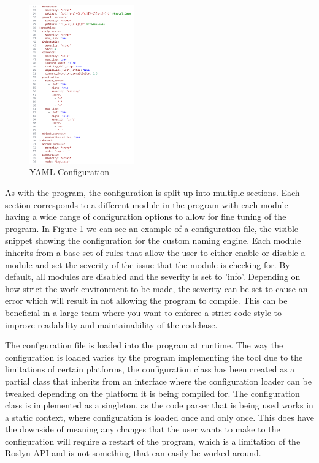 \begin{figure}
    \centering
    \caption{YAML Configuration}
    \label{fig:YAMLConfiguration}
    \includegraphics[width=0.4\textwidth]{Figures/YAMLConfigurationCropped.png}
\end{figure}

As with the program, the configuration is split up into multiple sections. Each section corresponds to a different module in the program with each module having a wide range of configuration options to allow for fine tuning of the program. In Figure \ref{fig:YAMLConfiguration} we can see an example of a configuration file, the visible snippet showing the configuration for the custom naming engine. Each module inherits from a base set of rules that allow the user to either enable or disable a module and set the severity of the issue that the module is checking for. By default, all modules are disabled and the severity is set to 'info'. Depending on how strict the work environment to be made, the severity can be set to cause an error which will result in not allowing the program to compile. This can be beneficial in a large team where you want to enforce a strict code style to improve readability and maintainability of the codebase.

The configuration file is loaded into the program at runtime. The way the configuration is loaded varies by the program implementing the tool due to the limitations of certain platforms, the configuration class has been created as a partial class that inherits from an interface where the configuration loader can be tweaked depending on the platform it is being compiled for. The configuration class is implemented as a singleton, as the code parser that is being used works in a static context, where configuration is loaded once and only once. This does have the downside of meaning any changes that the user wants to make to the configuration will require a restart of the program, which is a limitation of the Roslyn API and is not something that can easily be worked around.

